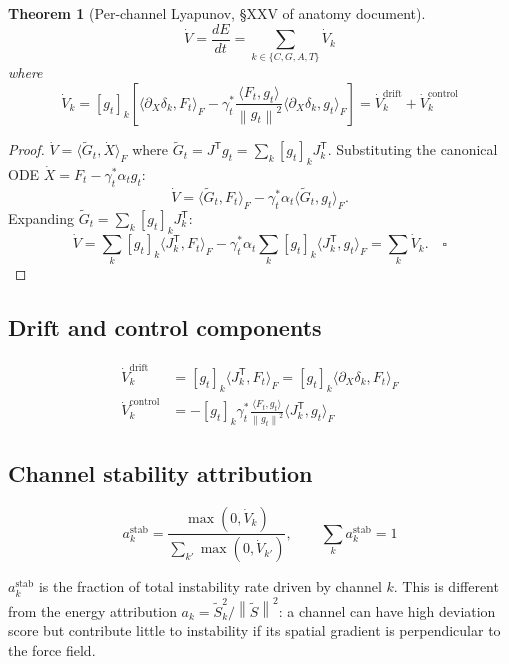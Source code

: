 \documentclass[11pt,a4paper]{article}
\newtheorem{theorem}{Theorem}[section]
\theoremstyle{definition}
\newcommand{\T}{^{\mathsf{T}}}
\newcommand{\norm}[1]{\left\|#1\right\|}
\begin{document}
\begin{theorem}[Per-channel Lyapunov, §XXV of anatomy document]
\[
\dot V = \frac{dE}{dt} = \sum_{k\in\{C,G,A,T\}}\dot V_k
\]
where
\[
\dot V_k = [g_t]_k\left[\langle\partial_X\delta_k, F_t\rangle_F
- \gamma^*_t\frac{\langle F_t, g_t\rangle}{\norm{g_t}^2}\langle\partial_X\delta_k, g_t\rangle_F\right]
= \dot V_k^\mathrm{drift} + \dot V_k^\mathrm{control}
\]
\end{theorem}

\begin{proof}
$\dot V = \langle\tilde G_t, \dot X\rangle_F$ where $\tilde G_t = J\T g_t = \sum_k[g_t]_k J_k\T$.
Substituting the canonical ODE $\dot X = F_t - \gamma^*_t\alpha_t g_t$:
\[
\dot V = \langle\tilde G_t, F_t\rangle_F - \gamma^*_t\alpha_t\langle\tilde G_t, g_t\rangle_F.
\]
Expanding $\tilde G_t = \sum_k[g_t]_k J_k\T$:
\[
\dot V = \sum_k[g_t]_k\langle J_k\T, F_t\rangle_F - \gamma^*_t\alpha_t\sum_k[g_t]_k\langle J_k\T, g_t\rangle_F
= \sum_k\dot V_k. \quad\square
\]
\end{proof}

\subsection{Drift and control components}

\begin{align*}
\dot V_k^\mathrm{drift} &= [g_t]_k\langle J_k\T, F_t\rangle_F = [g_t]_k\langle\partial_X\delta_k, F_t\rangle_F \\[4pt]
\dot V_k^\mathrm{control} &= -[g_t]_k\gamma^*_t\frac{\langle F_t,g_t\rangle}{\norm{g_t}^2}\langle J_k\T, g_t\rangle_F
\end{align*}

\subsection{Channel stability attribution}

\begin{lockedbox}
\[
a_k^\mathrm{stab} = \frac{\max(0,\dot V_k)}{\sum_{k'}\max(0,\dot V_{k'})}, \qquad \sum_k a_k^\mathrm{stab} = 1
\]
\end{lockedbox}

$a_k^\mathrm{stab}$ is the fraction of total instability rate driven by channel $k$.
This is different from the energy attribution $a_k = \tilde S_k^2/\norm{\tilde S}^2$:
a channel can have high deviation score but contribute little to instability
if its spatial gradient is perpendicular to the force field.
\end{document}
